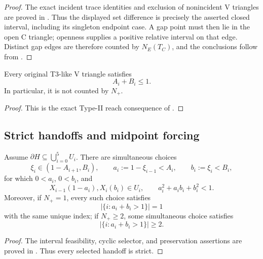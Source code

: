 \begin{proof}
The exact incident trace identities and exclusion of nonincident V triangles
are proved in .  Thus the displayed
set difference is precisely the asserted closed interval, including its
singleton endpoint case.  A gap point must then lie in the open C triangle;
openness supplies a positive relative interval on that edge.  Distinct gap
edges are therefore counted by $N_E(T_C)$, and the conclusions follow from
.
\end{proof}

\begin{lemma}
\label{lem:t3-nonsupercritical}
Every original T3-like V triangle satisfies
\begin{equation}
 A_i+B_i\le1.
 \label{eq:t3-nonsupercritical}
\end{equation}
In particular, it is not counted by $N_+$.
\end{lemma}

\begin{proof}
This is the exact Type-II reach consequence of
.
\end{proof}

\subsection{Strict handoffs and midpoint forcing}

\begin{proposition}
\label{prop:strict-handoffs}
Assume $\partial H\subseteq\bigcup_{i=0}^5U_i$.  There are simultaneous
choices
\[
 \xi_i\in(1-A_{i+1},B_i),
 \qquad
 a_i:=1-\xi_{i-1}<A_i,
 \qquad
 b_i:=\xi_i<B_i,
\]
for which $0<a_i$, $0<b_i$, and
\[
 X_{i-1}(1-a_i),X_i(b_i)\in U_i,
 \qquad
 a_i^2+a_ib_i+b_i^2<1.
\]
Moreover, if $N_+=1$, every such choice satisfies
\[
 \left\lvert\{i:a_i+b_i>1\}\right\rvert=1
\]
with the same unique index; if $N_+\ge2$, some simultaneous choice satisfies
\[
 \left\lvert\{i:a_i+b_i>1\}\right\rvert\ge2.
\]
\end{proposition}

\begin{proof}
The interval feasibility, cyclic selector, and preservation assertions are
proved in .  Thus every selected
handoff is strict.
\end{proof}


